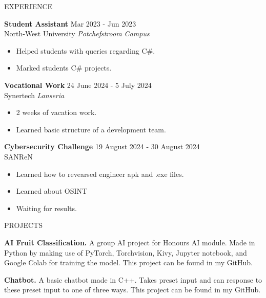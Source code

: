 \documentclass{resume} %
\begin{document}
\begin{rSection}{EXPERIENCE}

\textbf{Student Assistant} \hfill Mar 2023 - Jun 2023\\
North-West University \hfill \textit{Potchefstroom Campus}
\begin{itemize}
    \itemsep -3pt {} 
    \item Helped students with queries regarding C\#.
    \item Marked students C\# projects. 
\end{itemize}

\textbf{Vocational Work} \hfill 24 June 2024 - 5 July 2024\\
Synertech \hfill \textit{Lanseria}
\begin{itemize}
    \itemsep -3pt {} 
    \item 2 weeks of vacation work.
    \item Learned basic structure of a development team.
\end{itemize}

\textbf{Cybersecurity Challenge} \hfill 19 August 2024 - 30 August 2024\\
SANReN \hfill %
\begin{itemize}
    \itemsep -3pt {} 
    \item Learned how to revearsed engineer apk and .exe files.
    \item Learned about OSINT
    \item Waiting for results.
\end{itemize}

\end{rSection} 


\begin{rSection}{PROJECTS}
\vspace{-1.25em}
\item \textbf{AI Fruit Classification.} {A group AI project for Honours AI module. Made in Python by making use of PyTorch, Torchvision, Kivy, Jupyter notebook, and Google Colab for training the model. This project can be found in my GitHub.}
\item \textbf{Chatbot.} {A basic chatbot made in C++. Takes preset input and can response to these preset input to one of three ways. This project can be found in my GitHub.}
\end{rSection} 
\end{document}
